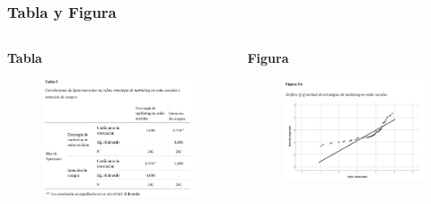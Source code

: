 \documentclass[
11pt, %
]{beamer}
\begin{document}
\begin{frame}
	\frametitle{Tabla y Figura}

	\begin{columns}[c] %
		\begin{column}{0.5\textwidth} %
			\textbf{Tabla}
			\begin{figure}
				\centering
				\includegraphics[width=1\linewidth]{images/screenshot002}
			\end{figure}

		\end{column}
		\begin{column}{0.5\textwidth} %
			\textbf{Figura}

			\begin{figure}
				\centering
				\includegraphics[width=1\linewidth]{images/screenshot003}
			\end{figure}

		\end{column}
	\end{columns}

\end{frame}
\end{document}
